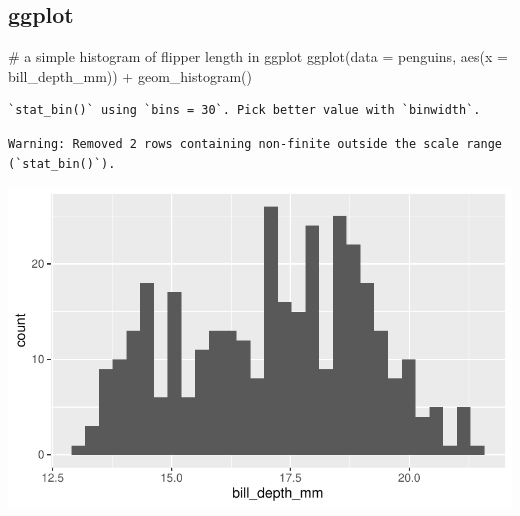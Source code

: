 \documentclass[
  letterpaper,
  DIV=11,
  numbers=noendperiod]{scrreprt}
\newenvironment{Shaded}{\begin{snugshade}}{\end{snugshade}}
\newcommand{\AttributeTok}[1]{\textcolor[rgb]{0.40,0.45,0.13}{#1}}
\newcommand{\CommentTok}[1]{\textcolor[rgb]{0.37,0.37,0.37}{#1}}
\newcommand{\FunctionTok}[1]{\textcolor[rgb]{0.28,0.35,0.67}{#1}}
\newcommand{\NormalTok}[1]{\textcolor[rgb]{0.00,0.23,0.31}{#1}}
\newcommand{\SpecialCharTok}[1]{\textcolor[rgb]{0.37,0.37,0.37}{#1}}
\begin{document}
\begin{tcolorbox}[enhanced jigsaw, bottomtitle=1mm, bottomrule=.15mm, toprule=.15mm, opacityback=0, leftrule=.75mm, breakable, colback=white, toptitle=1mm, left=2mm, coltitle=black, titlerule=0mm, opacitybacktitle=0.6, title=\textcolor{quarto-callout-tip-color}{\faLightbulb}\hspace{0.5em}{Hint -- a reminder of the basic syntax for histograms}, rightrule=.15mm, arc=.35mm, colframe=quarto-callout-tip-color-frame, colbacktitle=quarto-callout-tip-color!10!white]

\section{ggplot}

\begin{Shaded}
\begin{Highlighting}[]
\CommentTok{\# a simple histogram of flipper length in ggplot}
\FunctionTok{ggplot}\NormalTok{(}\AttributeTok{data =}\NormalTok{ penguins, }\FunctionTok{aes}\NormalTok{(}\AttributeTok{x =}\NormalTok{ bill\_depth\_mm)) }\SpecialCharTok{+}
  \FunctionTok{geom\_histogram}\NormalTok{() }
\end{Highlighting}
\end{Shaded}

\begin{verbatim}
`stat_bin()` using `bins = 30`. Pick better value with `binwidth`.
\end{verbatim}

\begin{verbatim}
Warning: Removed 2 rows containing non-finite outside the scale range
(`stat_bin()`).
\end{verbatim}

\includegraphics{scripts/02_dataViz/class4_files/figure-pdf/histogram2-1.pdf}


\end{tcolorbox}
\end{document}
